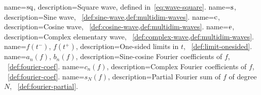 {
  name={$\operatorname{sq}$},
  description={Square wave, defined in~\cref{eq:wave-square}.}
}
{
  name={$\operatorname{s}$},
  description={Sine wave, \cf~\cref{def:sine-wave,def:multidim-waves}.}
}
{
  name={$\operatorname{c}$},
  description={Cosine wave, \cf~\cref{def:cosine-wave,def:multidim-waves}.}
}
{
  name={$\operatorname{e}$},
  description={Complex elementary wave, \cf~\cref{def:complex-wave,def:multidim-waves}.}
}
{
  name={$f(t^-)$, $f(t^+)$},
  description={One-sided limits in $t$, \cf~\cref{def:limit-onesided}.}
}
{
  name={$a_n(f)$, $b_n(f)$},
  description={Sine-cosine Fourier coefficients of $f$, \cf~\cref{def:fourier-coef}.}
}
{
  name={$c_n(f)$},
  description={Complex Fourier coefficients of $f$, \cf~\cref{def:fourier-coef}.}
}
{
  name={$s_N(f)$},
  description={Partial Fourier sum of $f$ of degree $N$, \cf~\cref{def:fourier-partial}.}
}
\makeglossaries
